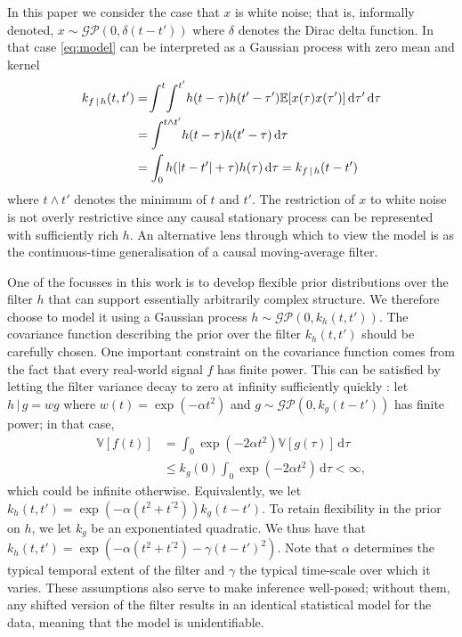 \documentclass{article}
\newcommand{\id}[1]{\, \mathrm{d} #1}     %
\newcommand{\cond}{\, | \,}               %
\begin{document}
In this paper we consider the case that $x$ is white noise; that is, informally denoted, $x \sim \mathcal{GP}(0,\delta(t-t'))$ where $\delta$ denotes the Dirac delta function. In that case \cref{eq:model} can be interpreted as a Gaussian process with zero mean and kernel
\begin{align}
    k_{f\cond h}(t,t')&= \!\int^t \! \int^{t'}\!h(t- \tau) \vspace{-1mm} h(t'- \tau')
        \mathbb{E}[ x(\tau) x(\tau')]\id{\tau'} \id{\tau} \nonumber \\
    &= \int^{t \land t'} \! h(t - \tau) h(t' - \tau) \id{\tau} \nonumber \\
    &= \int_0 h(|t - t'| + \tau)h(\tau) \id{\tau} = k_{f\cond h}(t-t')  \label{eq:kernel}
\end{align}
where $t \land t'$ denotes the minimum of $t$ and $t'$. The restriction of $x$ to white noise is not overly restrictive since any causal stationary process can be represented with sufficiently rich $h$. An alternative lens through which to view the model is as the continuous-time generalisation of a causal moving-average filter.

One of the focusses in this work is to develop flexible prior distributions over the filter $h$ that can support essentially arbitrarily complex structure. We therefore choose to model it using a Gaussian process $h \sim \mathcal{GP}(0,k_h(t,t'))$. The covariance function describing the prior over the filter $k_h(t,t')$ should be carefully chosen. One important constraint on the covariance function comes from the fact that every real-world signal $f$ has finite power. This can be satisfied by letting the filter variance decay to zero at infinity sufficiently quickly \cite{Tobar:2015:Learning_Stationary}: let $h\cond g = w g$ where $w(t)= \exp(- \alpha t^2)$ and $g \sim \mathcal{GP}(0,k_g(t-t'))$ has finite power; in that case, %
\begin{align*}
    \mathbb{V}[f(t)]
    &= \int_{0}\exp(-2 \alpha t^2)\mathbb{V}[g(\tau)]\id{\tau} \\
    &\le k_g(0) \int_0 \exp(- 2 \alpha t^2) \id{\tau} < \infty,
\end{align*}
which could be infinite otherwise.
Equivalently, we let $k_h(t,t')=\exp(- \alpha (t^2 + t^{\prime 2}))k_g(t-t')$. To retain flexibility in the prior on $h$, we let $k_g$ be an exponentiated quadratic. We thus have that $k_h(t,t')=\exp(- \alpha (t^2 + t^{\prime 2}) - \gamma(t-t')^2)$. Note that $\alpha$ determines the typical temporal extent of the filter and $\gamma$ the typical time-scale over which it varies. These assumptions also serve to make inference well-posed; without them, any shifted version of the filter results in an identical statistical model for the data, meaning that the model is unidentifiable.
\end{document}
